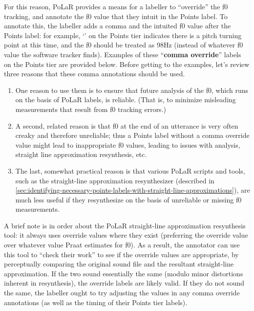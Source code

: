 \documentclass[11pt, twoside]{memoir}
\def\textlabel#1{{\relsize{-.5}\fontspec[Mapping=tex-text]{Roboto Mono}{#1}}}
\begin{document}
For this reason, PoLaR provides a means for a labeller to “override” the f0 tracking, and annotate the f0 value that they intuit in the Points label. To annotate this, the labeller adds a comma and the intuited f0 value after the Points label: for example, ‘\textlabel{0,98}’ on the Points tier indicates there is a pitch turning point at this time, and the f0 should be treated as 98Hz (instead of whatever f0 value the software tracker finds). Examples of these “\textbf{comma override}” labels on the Points tier are provided below.
Before getting to the examples, let’s review three reasons that these comma annotations should be used.
\begin{enumerate}
	\item One reason to use them is to ensure that future analysis of the f0, which runs on the basis of PoLaR labels, is reliable. (That is, to minimize misleading measurements that result from f0 tracking errors.)
	\item A second, related reason is that f0 at the end of an utterance is very often creaky and therefore unreliable; thus a Points label without a comma override value might lead to inappropriate f0 values, leading to issues with analysis, straight line approximation resynthesis, etc.
	\item The last, somewhat practical  reason is that various PoLaR scripts and tools, such as the straight-line approximation resynthesizer (described in \ref{sec:identifying-necessary-points-labels-with-straight-line-approximations}), are much less useful if they resynthesize on the basis of unreliable or missing f0 measurements.
\end{enumerate}
A brief note is in order about the PoLaR straight-line approximation resynthesis tool: it always uses override values where they exist (preferring the override value over whatever value Praat estimates for f0). As a result, the annotator can use this tool to “check their work” to see if the override values are appropriate, by perceptually comparing the original sound file and the resultant straight-line approximation. If the two sound essentially the same (modulo minor distortions inherent in resynthesis), the override labels are likely valid. If they do not sound the same, the labeller ought to try adjusting the values in any comma override annotations (as well as the timing of their Points tier labels).
\end{document}
